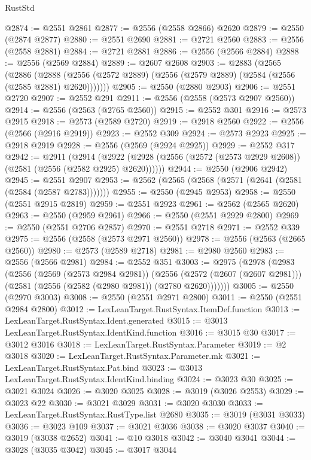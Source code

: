 \begin{lexlean}{RustStd}
\begin{coremodule}
@2874 := @2551 @2861
@2877 := @2556 (@2558 @2866) @2620
@2879 := @2550 (@2874 @2877)
@2880 := @2551 @2690
@2881 := @2721 @2560
@2883 := @2556 (@2558 @2881)
@2884 := @2721 @2881
@2886 := @2556 (@2566 @2884)
@2888 := @2556 (@2569 @2884)
@2889 := @2607 @2608
@2903 := @2883
    (@2565
      (@2886
        (@2888 (@2556 (@2572 @2889) (@2556 (@2579 @2889) (@2584 (@2556 (@2585 @2881) @2620)))))))
@2905 := @2550 (@2880 @2903)
@2906 := @2551 @2720
@2907 := @2552 @291
@2911 := @2556 (@2558 (@2573 @2907 @2560))
@2914 := @2556 (@2563 (@2765 @2560))
@2915 := @2552 @301
@2916 := @2573 @2915
@2918 := @2573 (@2589 @2720)
@2919 := @2918 @2560
@2922 := @2556 (@2566 (@2916 @2919))
@2923 := @2552 @309
@2924 := @2573 @2923
@2925 := @2918 @2919
@2928 := @2556 (@2569 (@2924 @2925))
@2929 := @2552 @317
@2942 := @2911
    (@2914 (@2922 (@2928 (@2556 (@2572 (@2573 @2929 @2608)) (@2581 (@2556 (@2582 @2925) @2620))))))
@2944 := @2550 (@2906 @2942)
@2945 := @2551 @2907
@2953 := @2562 (@2565 (@2568 (@2571 (@2641 (@2581 (@2584 (@2587 @2783)))))))
@2955 := @2550 (@2945 @2953)
@2958 := @2550 (@2551 @2915 @2819)
@2959 := @2551 @2923
@2961 := @2562 (@2565 @2620)
@2963 := @2550 (@2959 @2961)
@2966 := @2550 (@2551 @2929 @2800)
@2969 := @2550 (@2551 @2706 @2857)
@2970 := @2551 @2718
@2971 := @2552 @339
@2975 := @2556 (@2558 (@2573 @2971 @2560))
@2978 := @2556 (@2563 (@2665 @2560))
@2980 := @2573 (@2589 @2718)
@2981 := @2980 @2560
@2983 := @2556 (@2566 @2981)
@2984 := @2552 @351
@3003 := @2975
    (@2978
      (@2983
        (@2556
          (@2569 (@2573 @2984 @2981))
          (@2556
            (@2572 (@2607 (@2607 @2981)))
            (@2581 (@2556 (@2582 (@2980 @2981)) (@2780 @2620)))))))
@3005 := @2550 (@2970 @3003)
@3008 := @2550 (@2551 @2971 @2800)
@3011 := @2550 (@2551 @2984 @2800)
@3012 := LexLeanTarget.RustSyntax.ItemDef.function
@3013 := LexLeanTarget.RustSyntax.Ident.generated
@3015 := @3013 LexLeanTarget.RustSyntax.IdentKind.function
@3016 := @3015 @30
@3017 := @3012 @3016
@3018 := LexLeanTarget.RustSyntax.Parameter
@3019 := @2 @3018
@3020 := LexLeanTarget.RustSyntax.Parameter.mk
@3021 := LexLeanTarget.RustSyntax.Pat.bind
@3023 := @3013 LexLeanTarget.RustSyntax.IdentKind.binding
@3024 := @3023 @30
@3025 := @3021 @3024
@3026 := @3020 @3025
@3028 := @3019 (@3026 @2553)
@3029 := @3023 @22
@3030 := @3021 @3029
@3031 := @3020 @3030
@3033 := LexLeanTarget.RustSyntax.RustType.list @2680
@3035 := @3019 (@3031 @3033)
@3036 := @3023 @109
@3037 := @3021 @3036
@3038 := @3020 @3037
@3040 := @3019 (@3038 @2652)
@3041 := @10 @3018
@3042 := @3040 @3041
@3044 := @3028 (@3035 @3042)
@3045 := @3017 @3044

\end{coremodule}
\end{lexlean}
